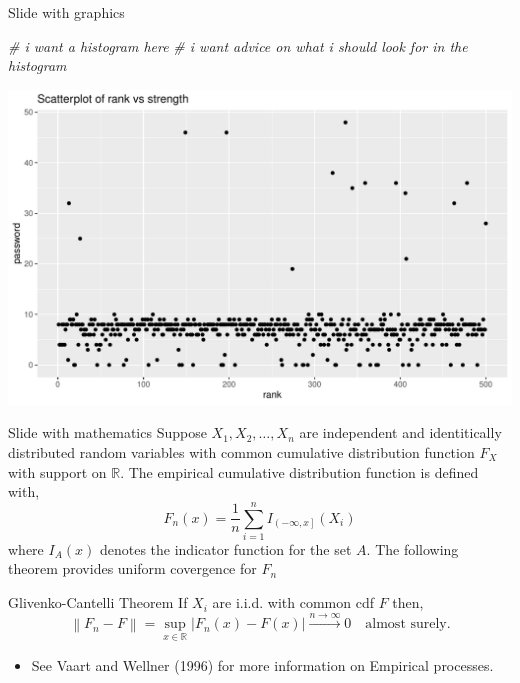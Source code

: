 \documentclass[10pt,ignorenonframetext,aspectratio=169]{beamer}
\newenvironment{Shaded}{\begin{snugshade}}{\end{snugshade}}
\newcommand{\CommentTok}[1]{\textcolor[rgb]{0.56,0.35,0.01}{\textit{#1}}}
\providecommand{\tightlist}{%
  \setlength{\itemsep}{0pt}\setlength{\parskip}{0pt}}
\renewenvironment{Shaded}{\color{black}\begin{snugshade}\color{black}}{\end{snugshade}}
\begin{document}
\begin{frame}[fragile]{Slide with graphics}
\begin{Shaded}
\begin{Highlighting}[]
\CommentTok{\# i want a histogram here}
\CommentTok{\# i want advice on what i should look for in the histogram}
\end{Highlighting}
\end{Shaded}

\includegraphics{Untitled_files/figure-beamer/unnamed-chunk-1-1.pdf}
\end{frame}

\begin{frame}{Slide with mathematics}
\protect\hypertarget{slide-with-mathematics}{}
Suppose \(X_1, X_2, \ldots, X_n\) are independent and identitically
distributed random variables with common cumulative distribution
function \(F_X\) with support on \(\mathbb{R}\). The empirical
cumulative distribution function is defined with, \[
  F_n(x) = \frac{1}{n}\sum_{i = 1}^n I_{\left( -\infty, x\right]}(X_i)
\] where \(I_A(x)\) denotes the indicator function for the set \(A\).
The following theorem provides uniform covergence for \(F_n\)

\begin{block}{Glivenko-Cantelli Theorem}
\protect\hypertarget{glivenko-cantelli-theorem}{}
If \(X_i\) are i.i.d. with common cdf \(F\) then, \[
  \left\| F_n - F \right\| = \sup_{x \in \mathbb{R}} |F_n(x) - F(x)| \stackrel{n \to \infty}{\longrightarrow} 0\quad \text{almost surely.}
\]
\end{block}

\begin{itemize}[<+->]
\tightlist
\item
  See Vaart and Wellner (1996) for more information on Empirical
  processes.
\end{itemize}
\end{frame}
\end{document}
